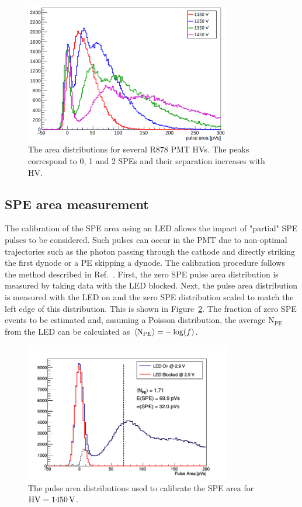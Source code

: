 \documentclass[12pt]{article}
\newcommand{\unit}[1]{\ensuremath{\text{\,#1}}\xspace}
\newcommand{\npe} {\mbox{\ensuremath{\textrm{N}_\textrm{PE}}}\xspace}
\begin{document}
\begin{figure}[ht!]
    \centering
    \includegraphics[width=0.8\textwidth]{figures/LEDareas}
    \caption{\label{fig:LEDPulseAreas} The area distributions for several R878 PMT HVs. The peaks correspond 
    to 0, 1 and 2 SPEs and their separation increases with HV.}
\end{figure}

\subsection{SPE area measurement}
\label{sec:ledarea}
The calibration of the SPE area using an LED allows the impact of "partial" SPE pulses to be considered.
Such pulses can occur in the PMT due to non-optimal trajectories such as the photon passing through the cathode and directly
striking the first dynode or a PE skipping a dynode. The calibration procedure follows the method described
in Ref.~\cite{Saldanha:2016mkn}. First, the zero SPE pulse area distribution is measured by taking data with the LED blocked.
Next, the pulse area distribution is measured with the LED on and the zero SPE distribution scaled to match the left edge of 
this distribution. This is shown in Figure~\ref{fig:SPEcalib}. The fraction of zero SPE events to be estimated and, assuming 
a Poisson distribution, the average \npe from the LED can be calculated as $\left< \npe \right> = -\log(f)$.

\begin{figure}[ht!]
    \centering
    \includegraphics[width=0.8\textwidth]{figures/speCalib}
    \caption{\label{fig:SPEcalib} The pulse area distributions used to calibrate the SPE area for
    $\text{HV}=1450\unit{V}$.}
\end{figure}
\end{document}
